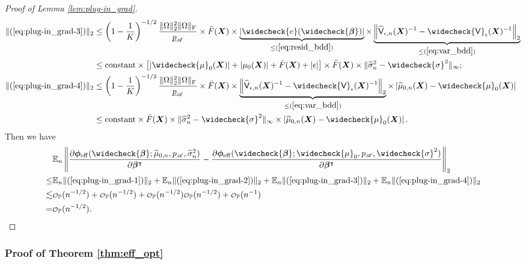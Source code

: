 \documentclass[11pt]{article}
\numberwithin{equation}{section}
\theoremstyle{definition}
\theoremstyle{remark}
\newcommand{\bX}{\bm{X}}
\newcommand{\bbeta}{\bm{\beta}}
\newcommand{\bphi}{\bm{\phi}}
\newcommand{\bbE}{\mathbb{E}}
\newcommand{\bbP}{\mathbb{P}}
\newcommand{\sA}{\mathscr{A}}
\newcommand{\sfV}{\mathsf{V}}
\newcommand\smallcO{
	\mathchoice
	{{\scriptstyle\mathcal{O}}}%
	{{\scriptstyle\mathcal{O}}}%
	{{\scriptscriptstyle\mathcal{O}}}%
	{\scalebox{.5}{$\scriptscriptstyle\mathcal{O}$}}%
}
\def\ubar#1{\underbar{$ #1 $}}
\newcommand{\eff}{\mathrm{eff}}
\begin{document}
\begin{proof}[Proof of Lemma \ref{lem:plug-in_grad}]
\begin{align*}
		\| (\ref{eq:plug-in_grad-3}) \|_{2} &\le \left( 1 - {1 \over K} \right)^{-1/2}{\| \Omega \|_{2}^{2}\| \Omega \|_{\rm F} \over \ubar{p}_{\sA}} \times \ddot{F}(\bX) \times \underbrace{\left| \widecheck{e}(\widecheck{\bbeta}) \right|}_{\le (\ref{eq:resid_bdd})} \times \underbrace{\left \| \widehat{\sfV}_{\epsilon,n}(\bX)^{-1} - \widecheck{\sfV}_{\epsilon}(\bX)^{-1} \right \|_{2}}_{\le (\ref{eq:var_bdd})}\\
		&\le \text{constant} \times \left[ |\widecheck{\mu}_{0}(\bX)| + |\mu_{0}(\bX)| + \dot{F}(\bX) + |\epsilon| \right] \times \ddot{F}(\bX) \times \| \widehat{\sigma}_{n}^{2} - \widecheck{\sigma}^{2} \|_{\infty};\\
		\| (\ref{eq:plug-in_grad-4}) \|_{2} &\le \left( 1 - {1 \over K} \right)^{-1/2}{\| \Omega \|_{2}^{2}\| \Omega \|_{\rm F} \over \ubar{p}_{\sA}} \times \ddot{F}(\bX) \times \underbrace{\left \| \widehat{\sfV}_{\epsilon,n}(\bX)^{-1} - \widecheck{\sfV}_{\epsilon}(\bX)^{-1} \right \|_{2}}_{\le (\ref{eq:var_bdd})} \times \left| \widehat{\mu}_{0,n}(\bX) - \widecheck{\mu}_{0}(\bX) \right|\\
		&\le \text{constant} \times \ddot{F}(\bX) \times \| \widehat{\sigma}_{n}^{2} - \widecheck{\sigma}^{2} \|_{\infty} \times \left| \widehat{\mu}_{0,n}(\bX) - \widecheck{\mu}_{0}(\bX) \right|.
	\end{align*}
	Then we have
	\begin{align*}
		&\bbE_{n}\left\| {\partial \bphi_{\eff}(\widecheck{\bbeta};\widehat{\mu}_{0,n},p_{\sA},\widehat{\sigma}_{n}^{2})\over \partial \bbeta^{\intercal}} - {\partial \bphi_{\eff}(\widecheck{\bbeta};\widecheck{\mu}_{0},p_{\sA},\widecheck{\sigma}^{2})\over \partial \bbeta^{\intercal}} \right\|_{2} \\
		\le& \bbE_{n}\| (\ref{eq:plug-in_grad-1}) \|_{2} + \bbE_{n}\| (\ref{eq:plug-in_grad-2}) \|_{2} + \bbE_{n}\| (\ref{eq:plug-in_grad-3}) \|_{2} + \bbE_{n}\| (\ref{eq:plug-in_grad-4}) \|_{2}\\
		\lesssim& \smallcO_{\bbP}(n^{-1/2}) + \smallcO_{\bbP}(n^{-1/2}) + \smallcO_{\bbP}(n^{-1/2}) \smallcO_{\bbP}(n^{-1/2}) + \smallcO_{\bbP}(n^{-1})\\
		=& \smallcO_{\bbP}(n^{-1/2}).
	\end{align*}
\end{proof}

\subsubsection{Proof of Theorem \ref{thm:eff_opt}}
\end{document}

